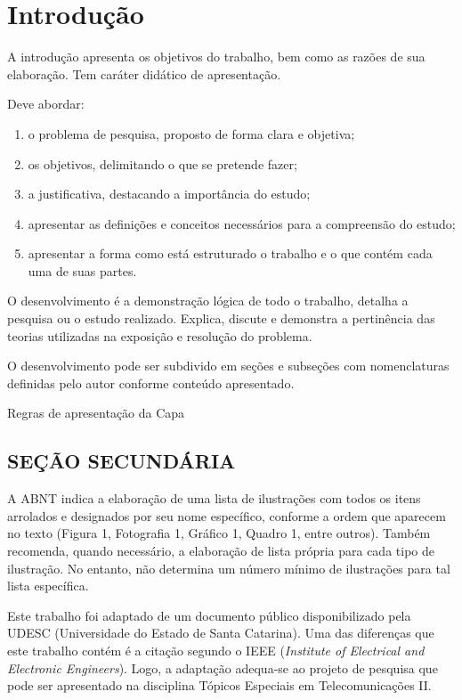 


\chapter{Introdução}

A introdução apresenta os objetivos do trabalho, bem como as razões de sua elaboração. Tem caráter didático de apresentação.

Deve abordar:
\begin{enumerate}[noitemsep,nosep,labelindent=\parindent,leftmargin=*,label={\alph*}) ] 
	\item o problema de pesquisa, proposto de forma clara e objetiva;
	\item os objetivos, delimitando o que se pretende fazer;
	\item a justificativa, destacando a importância do estudo;
	\item apresentar as definições e conceitos necessários para a compreensão do estudo;
	\item apresentar a forma como está estruturado o trabalho e o que contém cada uma de suas partes.
\end{enumerate}

O desenvolvimento é a demonstração lógica de todo o trabalho, detalha a pesquisa ou o estudo realizado. Explica, discute e demonstra a pertinência das teorias utilizadas na exposição e resolução do problema. 

O desenvolvimento pode ser subdivido em seções e subseções com nomenclaturas definidas pelo autor conforme conteúdo apresentado. 

Regras de apresentação da Capa


\section{SEÇÃO SECUNDÁRIA}

A ABNT indica a elaboração de uma lista de ilustrações com todos os itens arrolados e designados por seu nome específico, conforme a ordem que aparecem no texto (Figura 1, Fotografia 1, Gráfico 1, Quadro 1, entre outros). Também recomenda, quando necessário, a elaboração de lista própria para cada tipo de ilustração. No entanto, não determina um número mínimo de ilustrações para tal lista específica.

Este trabalho foi adaptado de um documento público disponibilizado pela UDESC (Universidade do Estado de Santa Catarina). Uma das diferenças que este trabalho contém é a citação segundo o IEEE (\textit{Institute of Electrical and Electronic Engineers}). Logo, a adaptação adequa-se ao projeto de pesquisa que pode ser apresentado na disciplina Tópicos Especiais em Telecomunicações II.




